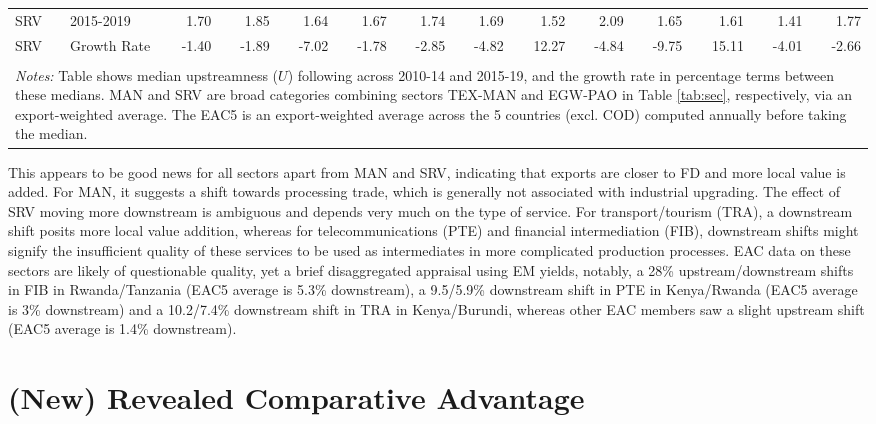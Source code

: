 \documentclass[a4paper]{article}
\begin{document}
\begin{table}[h!]
{\begin{tabular}{llrrrrrrrrrrrr}
  SRV & 2015-2019 & 1.70 & 1.85 & 1.64 & 1.67 & 1.74 & 1.69 & 1.52 & 2.09 & 1.65 & 1.61 & 1.41 & 1.77 \\ 
  SRV & Growth Rate & -1.40 & -1.89 & -7.02 & -1.78 & -2.85 & -4.82 & 12.27 & -4.84 & -9.75 & 15.11 & -4.01 & -2.66 \\ 
   \bottomrule \\ [-0.9em]
\multicolumn{14}{l}{\parbox{1.24\textwidth}{\scriptsize
\textit{Notes:} Table shows median upstreamness ($U$) following \citet{antras2012measuring} across 2010-14 and 2015-19, and the growth rate in percentage terms between these medians. MAN and SRV are broad categories combining sectors TEX-MAN and EGW-PAO in Table \ref{tab:sec}, respectively, via an export-weighted average. The EAC5 is an export-weighted average across the 5 countries (excl. COD) computed annually before taking the median.  }}
\end{tabular}
}
\end{table}
\FloatBarrier

This appears to be good news for all sectors apart from MAN and SRV, indicating that exports are closer to FD and more local value is added. For MAN, it suggests a shift towards processing trade, which is generally not associated with industrial upgrading. The effect of SRV moving more downstream is ambiguous and depends very much on the type of service. For transport/tourism (TRA), a downstream shift posits more local value addition, whereas for telecommunications (PTE) and financial intermediation (FIB), downstream shifts might signify the insufficient quality of these services to be used as intermediates in more complicated production processes. EAC data on these sectors are likely of questionable quality, yet a brief disaggregated appraisal using EM yields, notably, a 28\% upstream/downstream shifts in FIB in Rwanda/Tanzania (EAC5 average is 5.3\% downstream), a 9.5/5.9\% downstream shift in PTE in Kenya/Rwanda (EAC5 average is 3\% downstream) and a 10.2/7.4\% downstream shift in TRA in Kenya/Burundi, whereas other EAC members saw a slight upstream shift (EAC5 average is 1.4\% downstream). 


\section{(New) Revealed Comparative Advantage}
\end{document}
